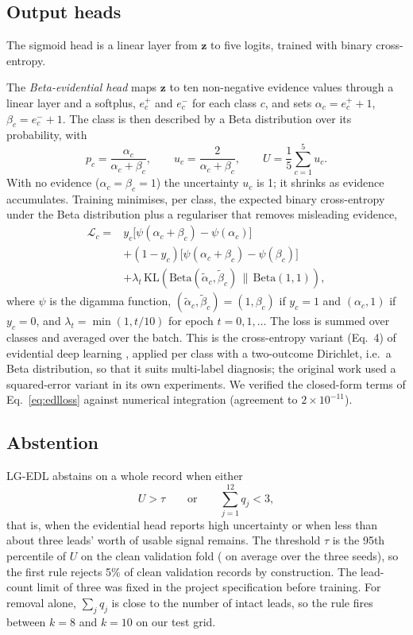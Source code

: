 \subsection{Output heads}
\label{sec:method-heads}
The sigmoid head is a linear layer from $\mathbf{z}$ to five logits, trained with binary cross-entropy.

The \emph{Beta-evidential head} maps $\mathbf{z}$ to ten non-negative evidence values through a linear layer and
a softplus, $e^{+}_c$ and $e^{-}_c$ for each class $c$, and sets $\alpha_c=e^{+}_c+1$, $\beta_c=e^{-}_c+1$. The
class is then described by a Beta distribution over its probability, with
\begin{equation}
p_c=\frac{\alpha_c}{\alpha_c+\beta_c},\qquad u_c=\frac{2}{\alpha_c+\beta_c},\qquad U=\frac{1}{5}\sum_{c=1}^{5}u_c .
\label{eq:edl}
\end{equation}
With no evidence ($\alpha_c=\beta_c=1$) the uncertainty $u_c$ is 1; it shrinks as evidence accumulates. Training
minimises, per class, the expected binary cross-entropy under the Beta distribution plus a regulariser that
removes misleading evidence,
\begin{align}
\mathcal{L}_c={}&y_c\big[\psi(\alpha_c+\beta_c)-\psi(\alpha_c)\big]\nonumber\\
&+(1-y_c)\big[\psi(\alpha_c+\beta_c)-\psi(\beta_c)\big]\nonumber\\
&+\lambda_t\,\mathrm{KL}\!\left(\mathrm{Beta}(\tilde\alpha_c,\tilde\beta_c)\,\|\,\mathrm{Beta}(1,1)\right),
\label{eq:edlloss}
\end{align}
where $\psi$ is the digamma function, $(\tilde\alpha_c,\tilde\beta_c)=(1,\beta_c)$ if $y_c=1$ and
$(\alpha_c,1)$ if $y_c=0$, and $\lambda_t=\min(1,t/10)$ for epoch $t=0,1,\dots$ The loss is summed over classes
and averaged over the batch. This is the cross-entropy variant (Eq.~4) of evidential deep learning
\cite{sensoy2018edl}, applied per class with a two-outcome Dirichlet, i.e.\ a Beta distribution, so
that it suits multi-label diagnosis; the original work used a squared-error variant in its own experiments. We
verified the closed-form terms of Eq.~\eqref{eq:edlloss} against numerical integration (agreement to
$2\times10^{-11}$).

\subsection{Abstention}
\label{sec:method-abstain}
LG-EDL abstains on a whole record when either
\begin{equation}
U>\tau\qquad\text{or}\qquad\textstyle\sum_{j=1}^{12}q_j<3,
\label{eq:abstain}
\end{equation}
that is, when the evidential head reports high uncertainty or when less than about three leads' worth of usable
signal remains. The threshold $\tau$ is the 95th percentile of $U$ on the clean validation fold
(\uThresholdMean{} on average over the three seeds), so the first rule rejects 5\% of clean validation records
by construction. The lead-count limit of three was fixed in the project specification before training. For
removal alone, $\sum_j q_j$ is close to the number of intact leads, so the rule fires between $k=8$ and $k=10$ on
our test grid.

